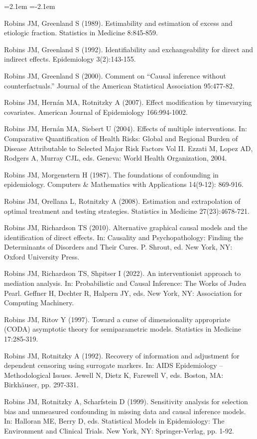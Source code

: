 \begin{list}{}{\leftmargin=2.1em   \itemindent=-2.1em \parsep=0pt \itemsep=1.6pt \topsep=4pt \rightmargin=0pt}
\item Robins JM, Greenland S (1989). Estimability and estimation of excess and etiologic fraction. Statistics in Medicine 8:845-859.
\item Robins JM, Greenland S (1992). Identifiability and exchangeability for direct and indirect effects. Epidemiology 3(2):143-155.
\item Robins JM, Greenland S (2000). Comment on ``Causal inference without counterfactuals.'' Journal of the American Statistical Association 95:477-82.
\item Robins JM, Hernán MA, Rotnitzky A (2007). Effect modification by timevarying covariates. American Journal of Epidemiology 166:994-1002.
\item Robins JM, Hernán MA, Siebert U (2004). Effects of multiple interventions. In: Comparative Quantification of Health Risks: Global and Regional Burden of Disease Attributable to Selected Major Risk Factors Vol II. Ezzati M, Lopez AD, Rodgers A, Murray CJL, eds. Geneva: World Health Organization, 2004.
\item Robins JM, Morgenstern H (1987). The foundations of confounding in epidemiology. Computers \& Mathematics with Applications 14(9-12): 869-916.
\item Robins JM, Orellana L, Rotnitzky A (2008). Estimation and extrapolation of optimal treatment and testing strategies. Statistics in Medicine 27(23):4678-721.
\item Robins JM, Richardson TS (2010). Alternative graphical causal models and the identification of direct effects. In: Causality and Psychopathology: Finding the Determinants of Disorders and Their Cures. P. Shrout, ed. New York, NY: Oxford University Press.
\item Robins JM, Richardson TS, Shpitser I (2022). An interventionist approach to mediation analysis. In: Probabilistic and Causal Inference: The Works of Judea Pearl. Geffner H, Dechter R, Halpern JY, eds. New York, NY: Association for Computing Machinery.
\item Robins JM, Ritov Y (1997). Toward a curse of dimensionality appropriate (CODA) asymptotic theory for semiparametric models. Statistics in Medicine 17:285-319.
\item Robins JM, Rotnitzky A (1992). Recovery of information and adjustment for dependent censoring using surrogate markers. In: AIDS Epidemiology – Methodological Issues. Jewell N, Dietz K, Farewell V, eds. Boston, MA: Birkhäuser, pp. 297-331.
\item Robins JM, Rotnitzky A, Scharfstein D (1999). Sensitivity analysis for selection bias and unmeasured confounding in missing data and causal inference models. In: Halloran ME, Berry D, eds. Statistical Models in Epidemiology: The Environment and Clinical Trials. New York, NY: Springer-Verlag, pp. 1-92.

\end{list}
